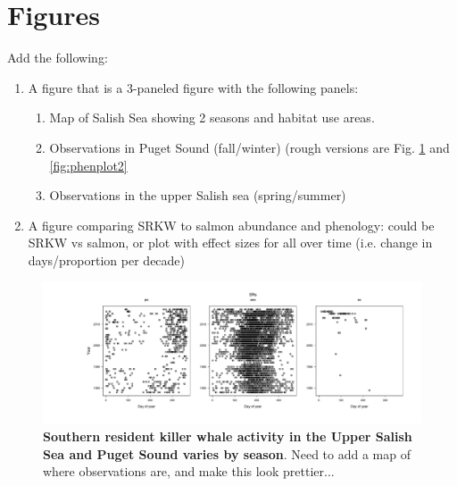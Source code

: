 \documentclass{article}
\begin{document}
\section* {Figures}
Add the following:
\begin{enumerate}
\item A figure that is a 3-paneled figure with the following panels: 
\begin{enumerate}
\item Map of Salish Sea showing 2 seasons and habitat use areas.
\item Observations in Puget Sound (fall/winter) (rough versions are Fig. \ref{fig:phenplot} and \ref{fig:phenplot2}
\item Observations in the upper Salish sea (spring/summer)
\end{enumerate}
\item A figure comparing SRKW to salmon abundance and phenology: could be SRKW vs salmon, or plot with effect sizes for all over time (i.e. change in days/proportion per decade)
\end{enumerate}
\begin{figure}[p]
\includegraphics{../analyses/figures/OrcaPhenPlots/SRKW_yr_doy.pdf} 
\caption{\textbf{Southern resident killer whale activity in the Upper Salish Sea and Puget Sound varies by season}. Need to add a map of where observations are, and make this look prettier...}
 \label{fig:phenplot}
 \end{figure}
 
\end{document}
